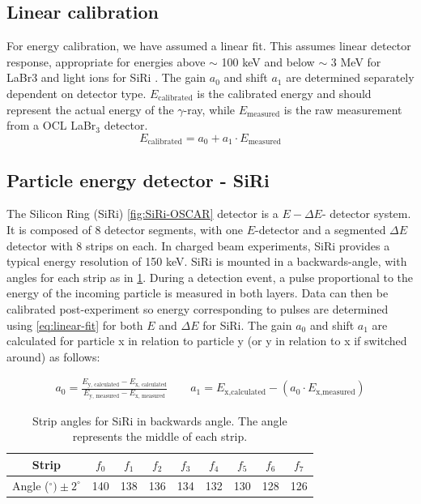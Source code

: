 \documentclass[a4paper,11pt]{article}
\begin{document}
\subsection{Linear calibration}
For energy calibration, we have assumed a linear fit. This assumes linear detector response, appropriate for energies above $\sim$ 100 keV and below $\sim$ 3 MeV for LaBr3 \cite{LaBr3_detector_response} and light ions for SiRi \cite{LEO}. The gain $a_0$ and shift $a_1$ are determined separately dependent on detector type. $E_\text{calibrated}$ is the calibrated energy and should represent the actual energy of the $\gamma$-ray, while $E_\text{measured}$ is the raw measurement from a OCL LaBr$_3$ detector. 
\begin{equation}
    E_\text{calibrated} = a_0 + a_1\cdot E_\text{measured}
    \label{eq:linear-fit}
\end{equation}


\subsection{Particle energy detector - SiRi}
The Silicon Ring (SiRi) \cref{fig:SiRi-OSCAR} detector is a $E - \Delta E$- detector system. It is composed of 8 detector segments, with one $E$-detector and a segmented $\Delta E$ detector with 8 strips on each. In charged beam experiments, SiRi provides a typical energy resolution of 150 keV\cite{TORNYI20146}. SiRi is mounted in a backwards-angle, with angles for each strip as in \cref{tab:SiRi-angles}. During a detection event, a pulse proportional to the energy of the incoming particle is measured in both layers. Data can then be calibrated post-experiment so energy corresponding to pulses are determined using \cref{eq:linear-fit} for both $E$ and $\Delta E$ for SiRi. The gain $a_0$ and shift $a_1$ are calculated for particle x in relation to particle y (or y in relation to x if switched around) as follows:

\begin{align}
    a_0 = \frac{ E_\text{y, calculated}-  E_\text{x, calculated}}{ E_\text{y, measured}-  E_\text{x, measured}} \qquad a_1 =  E_\text{x,calculated} -(a_0\cdot  E_\text{x,measured})\label{eq:a1b1} 
\end{align}



\begin{table}[htbp]
    \centering
    \caption{Strip angles for SiRi in backwards angle. The angle represents the middle of each strip.}
    \begin{tabular}{c cccccccc}
        \toprule
        Strip & $f_0$ & $f_1$ & $f_2$ & $f_3$ & $f_4$ & $f_5$ & $f_6$ & $f_7$ \\
        \midrule
        Angle ($^\circ) \pm 2^\circ$ & 140 & 138 & 136 & 134 & 132 & 130 & 128 & 126 \\
        \bottomrule
    \end{tabular}
    \label{tab:SiRi-angles}
\end{table}
\end{document}
